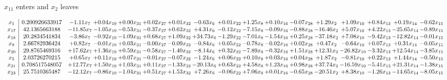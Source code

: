 \documentclass[9pt]{article}
\begin{document}
 $ x_{11} $ enters and $ x_{2} $ leaves 

 \[\begin{array}{c| c c@{\hskip 2pt} c@{\hskip 2pt} c@{\hskip 2pt} c@{\hskip 2pt} c@{\hskip 2pt} c@{\hskip 2pt} c@{\hskip 2pt} c@{\hskip 2pt} c@{\hskip 2pt} c@{\hskip 2pt} c@{\hskip 2pt} c@{\hskip 2pt} c@{\hskip 2pt} c@{\hskip 2pt} c@{\hskip 2pt} }
 x_{1}   &  0.200926633917 & -1.11 x_{7} & +  0.04 x_{19} & +  0.00 x_{31} & +  0.02 x_{27} & +  0.01 x_{32} & -0.63 x_{6} & +  0.01 x_{22} & +  1.25 x_{8} & +  0.10 x_{16} & -0.07 x_{28} & +  1.29 x_{2} & +  1.09 x_{10} & +  0.84 x_{13} & +  0.19 x_{14} & -0.62 x_{15}\\
 x_{17}   &  42.1365663188 & -11.85 x_{7} & -1.05 x_{19} & -0.53 x_{31} & -0.37 x_{27} & +  0.62 x_{32} & +  4.31 x_{6} & -0.12 x_{22} & -7.15 x_{8} & -0.09 x_{16} & -0.88 x_{28} & -16.46 x_{2} & +  5.07 x_{10} & +  4.22 x_{13} & -25.65 x_{14} & -0.89 x_{15}\\
 x_{18}   &  20.2834541834 & -3.86 x_{7} & -0.92 x_{19} & -1.09 x_{31} & +  0.68 x_{27} & +  1.09 x_{32} & + 34.73 x_{6} & -1.29 x_{22} & -7.01 x_{8} & -1.54 x_{16} & +  0.25 x_{28} & -37.18 x_{2} & +  7.08 x_{10} & -9.42 x_{13} & -12.82 x_{14} & -0.01 x_{15}\\
 x_{9}   &  2.66782936424 & +  0.82 x_{7} & -0.01 x_{19} & +  0.03 x_{31} & -0.00 x_{27} & -0.09 x_{32} & -0.84 x_{6} & +  0.05 x_{22} & -0.78 x_{8} & -0.02 x_{16} & +  0.02 x_{28} & +  0.47 x_{2} & -0.64 x_{10} & +  0.07 x_{13} & +  0.31 x_{14} & -0.05 x_{15}\\
 x_{20}   &  29.8765469316 & + 17.62 x_{7} & +  1.36 x_{19} & +  0.59 x_{31} & -0.58 x_{27} & -1.40 x_{32} & -8.14 x_{6} & +  0.32 x_{22} & -7.89 x_{8} & -0.32 x_{16} & +  1.51 x_{28} & + 12.31 x_{2} & -26.82 x_{10} & -3.32 x_{13} & + 12.54 x_{14} & -3.85 x_{15}\\
 x_{5}   &  2.03726270215 & +  0.65 x_{7} & +  0.11 x_{19} & +  0.07 x_{31} & -0.01 x_{27} & -0.07 x_{32} & -1.24 x_{6} & +  0.06 x_{22} & +  0.10 x_{8} & +  0.03 x_{16} & +  0.04 x_{28} & +  1.87 x_{2} & -0.81 x_{10} & +  0.22 x_{13} & +  1.44 x_{14} & -0.50 x_{15}\\
 x_{21}   &  0.708517548057 & + 12.77 x_{7} & +  1.50 x_{19} & +  1.03 x_{31} & +  0.11 x_{27} & -1.33 x_{32} & -20.13 x_{6} & +  0.63 x_{22} & +  4.58 x_{8} & +  1.23 x_{16} & +  0.98 x_{28} & + 37.74 x_{2} & -16.59 x_{10} & -5.41 x_{13} & + 21.31 x_{14} & -1.38 x_{15}\\
 x_{23}   &  25.7510365487 & -12.12 x_{7} & -0.86 x_{19} & -1.04 x_{31} & +  0.51 x_{27} & +  1.53 x_{32} & +  7.26 x_{6} & -0.06 x_{22} & +  7.06 x_{8} & +  0.01 x_{16} & -0.65 x_{28} & -20.51 x_{2} & +  8.38 x_{10} & -1.26 x_{13} & -14.65 x_{14} & -8.05 x_{15}\\

\end{array}\]
\end{document}
